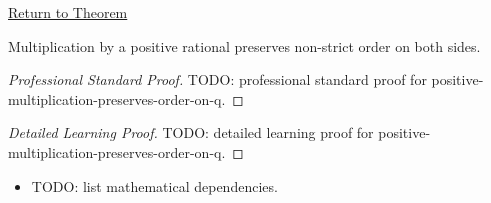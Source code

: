 \newpage
{}
\label{prf:positive-multiplication-preserves-order-on-q}

\begin{remark*}[Return]
\hyperref[thm:positive-multiplication-preserves-order-on-q]{Return to Theorem}
\end{remark*}

\begin{theorem*}
Multiplication by a positive rational preserves non-strict order on both sides.
\end{theorem*}

\begin{proof}[Professional Standard Proof]
\LRAProofBodyStart
TODO: professional standard proof for positive-multiplication-preserves-order-on-q.
\end{proof}

\begin{proof}[Detailed Learning Proof]
\LRAProofBodyStart
TODO: detailed learning proof for positive-multiplication-preserves-order-on-q.
\end{proof}

\begin{remark*}
\end{remark*}

\begin{dependencies}
\begin{itemize}
  \item TODO: list mathematical dependencies.
\end{itemize}
\end{dependencies}

\clearpage
